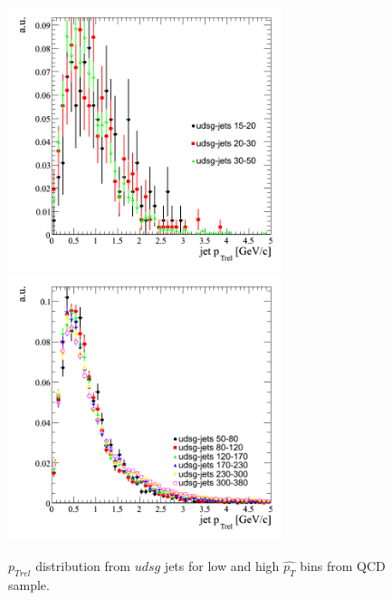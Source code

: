 \begin{figure}[htbp]
  \begin{center}
    \includegraphics[width=80mm]{Figures/jet_ptreludsgqcdbinned.png}
    \includegraphics[width=80mm]{Figures/jet_ptreludsgqcdbinned2.png}
  \end{center}
  \caption{$p_{Trel}$ distribution from $udsg$ jets for low and high $\hat{p_T}$ bins from QCD sample.}
  \label{fig:jet_ptrel_udsg}
\end{figure}

